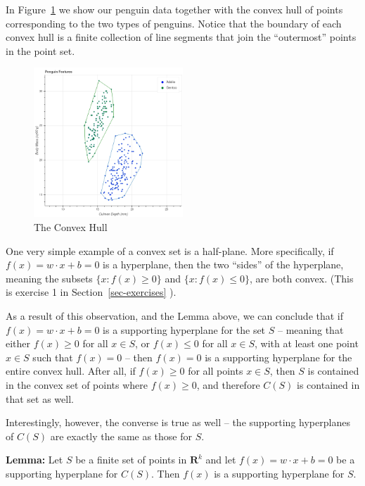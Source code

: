 \documentclass[
  11pt,
  letterpaper,
]{scrbook}
\theoremstyle{plain}
\theoremstyle{plain}
\theoremstyle{remark}
\begin{document}
In Figure~\ref{fig-convexhull} we show our penguin data together with
the convex hull of points corresponding to the two types of penguins.
Notice that the boundary of each convex hull is a finite collection of
line segments that join the ``outermost'' points in the point set.

\begin{figure}

{\centering \includegraphics[width=0.5\textwidth,height=\textheight]{chapters/img/penguinswithhulls.png}

}

\caption{\label{fig-convexhull}The Convex Hull}

\end{figure}

One very simple example of a convex set is a half-plane. More
specifically, if \(f(x)=w\cdot x+b=0\) is a hyperplane, then the two
``sides'' of the hyperplane, meaning the subsets \(\{x: f(x)\ge 0\}\)
and \(\{x: f(x)\le 0\}\), are both convex. (This is exercise 1 in
Section~\ref{sec-exercises} ).

As a result of this observation, and the Lemma above, we can conclude
that if \(f(x)=w\cdot x+b=0\) is a supporting hyperplane for the set
\(S\) -- meaning that either \(f(x)\ge 0\) for all \(x\in S\), or
\(f(x)\le 0\) for all \(x\in S\), with at least one point \(x\in S\)
such that \(f(x)=0\) -- then \(f(x)=0\) is a supporting hyperplane for
the entire convex hull. After all, if \(f(x)\ge 0\) for all points
\(x\in S\), then \(S\) is contained in the convex set of points where
\(f(x)\ge 0\), and therefore \(C(S)\) is contained in that set as well.

Interestingly, however, the converse is true as well -- the supporting
hyperplanes of \(C(S)\) are exactly the same as those for \(S\).

\textbf{Lemma:} Let \(S\) be a finite set of points in
\(\mathbf{R}^{k}\) and let \(f(x)=w\cdot x +b=0\) be a supporting
hyperplane for \(C(S)\). Then \(f(x)\) is a supporting hyperplane for
\(S\).
\end{document}
